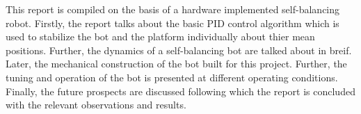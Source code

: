 This report is compiled on the basis of a hardware implemented self-balancing robot. Firstly, the report talks about the basic PID control algorithm which is used to stabilize the bot and the platform individually about thier mean positions. Further, the dynamics of a self-balancing bot are talked about in breif. Later, the mechanical construction of the bot built for this project. Further, the tuning and operation of the bot is presented at different operating conditions. Finally, the future prospects are discussed following which the report is concluded with the relevant observations and results.
